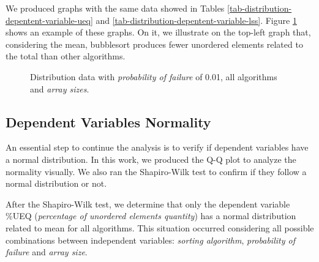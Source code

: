 We produced graphs with the same data showed in Tables \ref{tab-distribution-depentent-variable-ueq} and \ref{tab-distribution-depentent-variable-lss}. Figure \ref{fig-distribution-all-algorithms-001-all-sizes} shows an example of these graphs. On it, we illustrate on the top-left graph that, considering the mean, bubblesort produces fewer unordered elements related to the total than other algorithms.

\begin{figure}[H]
    \centering
    \caption{Distribution data with \textit{probability of failure} of 0.01, all algorithms and \textit{array sizes}.}
    \label{fig-distribution-all-algorithms-001-all-sizes}
\end{figure}

\subsection{Dependent Variables Normality}

An essential step to continue the analysis is to verify if dependent variables have a normal distribution. In this work, we produced the Q-Q plot to analyze the normality visually. We also ran the Shapiro-Wilk \cite{shapiro1965analysis} test to confirm if they follow a normal distribution or not.

After the Shapiro-Wilk test, we determine that only the dependent variable \%UEQ (\textit{percentage of unordered elements quantity}) has a normal distribution related to mean for all algorithms. This situation occurred considering all possible combinations between independent variables: \textit{sorting algorithm}, \textit{probability of failure} and \textit{array size}.

